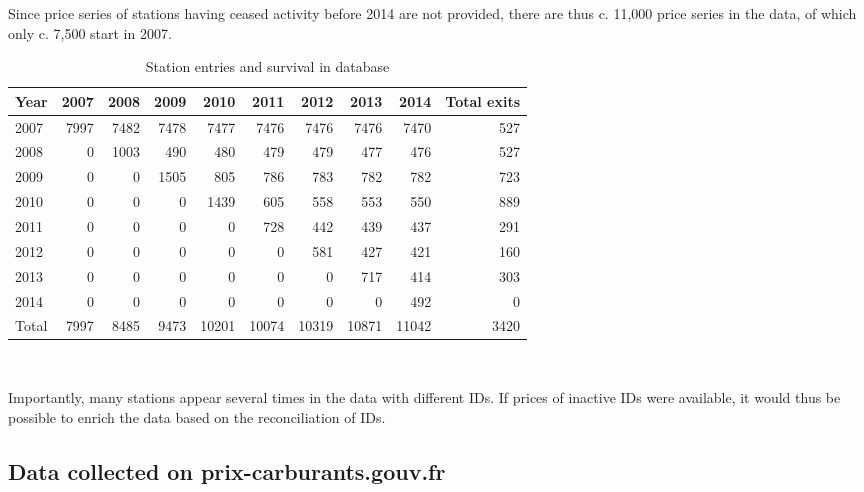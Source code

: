 \documentclass[11pt]{article}
\begin{document}
Since price series of stations having ceased activity before 2014 are not provided, there are thus c. 11,000 price series in the data, of which only c. 7,500 start in 2007.

\begin{table}[h]
\centering
\caption{Station entries and survival in database}
\begin{tabular}{lrrrrrrrrr}
\toprule
Year &  2007 &  2008 &  2009 &   2010 &   2011 &   2012 &   2013 &   2014 &   Total exits \\
\midrule
2007  &  7997 &  7482 &  7478 &   7477 &   7476 &   7476 &   7476 &   7470 &   527 \\
2008  &     0 &  1003 &   490 &    480 &    479 &    479 &    477 &    476 &   527 \\
2009  &     0 &     0 &  1505 &    805 &    786 &    783 &    782 &    782 &   723 \\
2010  &     0 &     0 &     0 &   1439 &    605 &    558 &    553 &    550 &   889 \\
2011  &     0 &     0 &     0 &      0 &    728 &    442 &    439 &    437 &   291 \\
2012  &     0 &     0 &     0 &      0 &      0 &    581 &    427 &    421 &   160 \\
2013  &     0 &     0 &     0 &      0 &      0 &      0 &    717 &    414 &   303 \\
2014  &     0 &     0 &     0 &      0 &      0 &      0 &      0 &    492 &     0 \\
Total &  7997 &  8485 &  9473 &  10201 &  10074 &  10319 &  10871 &  11042 &  3420 \\
\bottomrule
\end{tabular}
\\
\label{table:open_data_overview}
\end{table}

Importantly, many stations appear several times in the data with different IDs. If prices of inactive IDs were available, it would thus be possible to enrich the data based on the reconciliation of IDs.

\subsection{Data collected on prix-carburants.gouv.fr}
\end{document}
